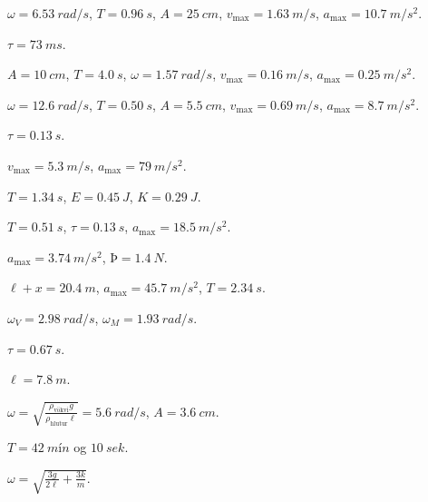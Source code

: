 \begin{enumerate*}[label = \vspace{0.15cm} \textbf{(\arabic*)}]
  \item $\omega = \SI{6.53}{rad/s}$, $T = \SI{0.96}{s}$, $A = \SI{25}{cm}$, $v_{\text{max}} = \SI{1.63}{m/s}$, $a_{\text{max}} = \SI{10.7}{m/s^2}$.
  \item $\tau = \SI{73}{ms}$.
  \item $A = \SI{10}{cm}$, $T = \SI{4.0}{s}$, $\omega = \SI{1.57}{rad/s}$, $v_{\text{max}} = \SI{0.16}{m/s}$, $a_{\text{max}} = \SI{0.25}{m/s^2}$.
  \item $\omega = \SI{12.6}{rad/s}$, $T = \SI{0.50}{s}$, $A = \SI{5.5}{cm}$, $v_{\text{max}} = \SI{0.69}{m/s}$, $a_{\text{max}} = \SI{8.7}{m/s^2}$.
  \item $\tau = \SI{0.13}{s}$.
  \item $v_{\text{max}} = \SI{5.3}{m/s}$, $a_{\text{max}} = \SI{79}{m/s^2}$.
  \item $T = \SI{1.34}{s}$, $E = \SI{0.45}{J}$, $K = \SI{0.29}{J}$.
  \item $T = \SI{0.51}{s}$, $\tau = \SI{0.13}{s}$, $a_{\text{max}} = \SI{18.5}{m/s^2}$.
  \item $a_{\text{max}} = \SI{3.74}{m/s^2}$, $Þ = \SI{1.4}{N}$.
  \item $\ell + x = \SI{20.4}{m}$, $a_{\text{max}} = \SI{45.7}{m/s^2}$, $T = \SI{2.34}{s}$.
  \item $\omega_V = \SI{2.98}{rad/s}$, $\omega_M = \SI{1.93}{rad/s}$.
  \item $\tau = \SI{0.67}{s}$.
  \item $\ell = \SI{7.8}{m}$.
  \item $\omega = \sqrt{\frac{\rho_{\text{vökvi}}g}{\rho_{\text{hlutur}}\ell}} = \SI{5.6}{rad/s}$, $A = \SI{3.6}{cm}$.
  \item $T = \SI{42}{mín}$ og $\SI{10}{sek}$. 
  \item $\omega = \sqrt{\frac{3g}{2\ell} + \frac{3k}{m}}$.
\end{enumerate*}

\newpage